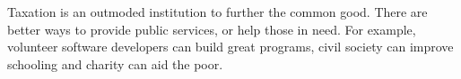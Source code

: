 Taxation is an outmoded institution to further the common good.
There are better ways to provide public services, or help those in need.
For example, volunteer software developers can build great programs, civil society can improve schooling and charity can aid the poor.